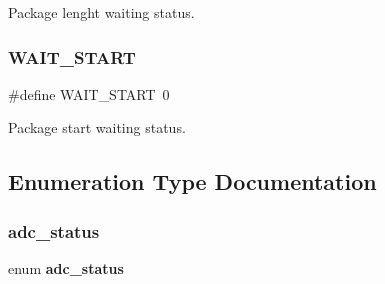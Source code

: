 Package lenght waiting status. \mbox{\label{globals_8h_aea55597952638136c7c929b238904c82}} 
\subsubsection{W\+A\+I\+T\+\_\+\+S\+T\+A\+RT}
{\footnotesize\ttfamily \#define W\+A\+I\+T\+\_\+\+S\+T\+A\+RT~0}

Package start waiting status. 

\subsection{Enumeration Type Documentation}
\mbox{\label{globals_8h_a66f719d83f18dc6d1369b0776f25b1ef}} 
\subsubsection{adc\+\_\+status}
{\footnotesize\ttfamily enum \textbf{ adc\+\_\+status}}

